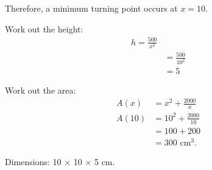 \begin{enumerate}
	Therefore, a minimum turning point occurs at $x=10$.
	
	Work out the height:
	\begin{align*}
		h = \frac{500}{x^2}\\
		&= \frac{500}{10^2}\\
		&= 5
	\end{align*}
	
	Work out the area:
	\begin{align*}
		A(x) &= x^2+\frac{2000}{x}\\
		A(10) &= 10^2+\frac{2000}{10}\\
		&= 100+200\\
		&= 300\text{ cm}^3\text{.}
	\end{align*}
	
	Dimensions: 10 $\times$ 10 $\times$ 5 cm.
\end{enumerate}
